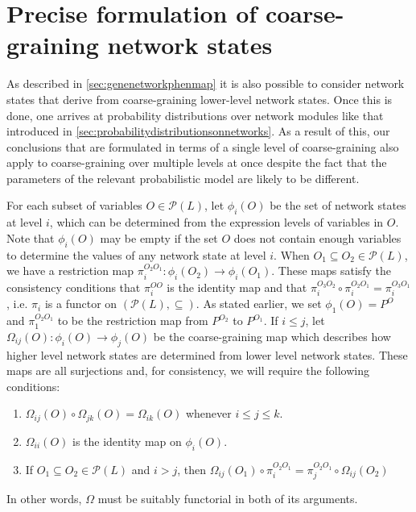 \section{Precise formulation of coarse-graining network states}\label{secsupp:coarsegrainingphenotypes}

As described in \autoref{sec:genenetworkphenmap} it is also possible to consider network states that derive from coarse-graining lower-level network states. Once this is done, one arrives at probability distributions over network modules like that introduced in \autoref{sec:probabilitydistributionsonnetworks}. As a result of this, our conclusions that are formulated in terms of a single level of coarse-graining \gnpm{} also apply to coarse-graining over multiple levels at once despite the fact that the parameters of the relevant probabilistic model are likely to be different.



For each subset of variables $O \in \mathcal{P}(L)$, let $\phi_i (O)$ be the set of network states at level $i$, which can be determined from the expression levels of variables in $O$.  Note that $\phi_i (O)$ may be empty if the set $O$ does not contain enough variables to determine the values of any network state at level $i$. When $O_1 \subseteq O_2 \in \mathcal{P}(L)$, we have a restriction map $\pi_i^{O_2 O_1} \colon \phi_i(O_2) \to \phi_i(O_1)$.  These maps satisfy the consistency conditions that $\pi_i^{OO}$ is the identity map and that $\pi_i^{O_3 O_2} \circ \pi_i^{O_2 O_1} = \pi_i^{O_3 O_1}$, i.e. $\pi_i$ is a functor on $(\mathcal{P}(L), \subseteq)$.  As stated earlier, we set $\phi_1 (O) = P^O$ and $\pi_1^{O_2 O_1}$ to be the restriction map from $P^{O_2}$ to $P^{O_1}$.  If $i \le j$, let $\Omega_{ij}(O) : \phi_i(O) \to \phi_j(O)$ be the coarse-graining map which describes how higher level network states are determined from lower level network states.  These maps are all surjections and, for consistency, we will require the following conditions:
\begin{enumerate}
\item $\Omega_{ij}(O) \circ \Omega_{jk}(O) = \Omega_{ik}(O)$ whenever $i \le j \le k$.
\item $\Omega_{ii}(O)$ is the identity map on $\phi_i (O)$.
\item If $O_1 \subseteq O_2 \in \mathcal{P}(L)$ and $i > j$, then $\Omega_{ij}(O_1) \circ \pi_i^{O_2 O_1} = \pi_j^{O_2 O_1} \circ \Omega_{ij}(O_2)$
\end{enumerate}
In other words, $\Omega$ must be suitably functorial in both of its arguments.

